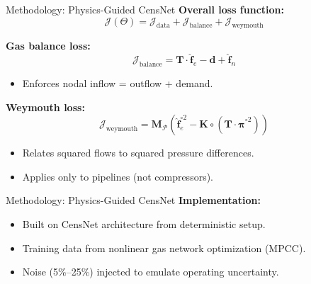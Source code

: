 \documentclass[hyperref={colorlinks,citecolor=blue,linkcolor=blue,urlcolor=blue}]{beamer}
\begin{document}
\begin{frame}{Methodology: Physics-Guided CensNet}
\small
\textbf{Overall loss function:}
\[
\mathcal{J}(\Theta) =
\mathcal{J}_{\text{data}} +
\mathcal{J}_{\text{balance}} +
\mathcal{J}_{\text{weymouth}}
\]

\textbf{Gas balance loss:}
\[
\mathcal{J}_{\text{balance}} =
\mathbf{T} \cdot \hat{\mathbf{f}}_e - \mathbf{d} + \hat{\mathbf{f}}_n
\]
\begin{itemize}
    \item Enforces nodal inflow = outflow + demand.
\end{itemize}

\textbf{Weymouth loss:}
\[
\mathcal{J}_{\text{weymouth}} =
\mathbf{M}_{\mathcal{P}}
\left( \hat{\mathbf{f}}_e^{\circ 2} -
\mathbf{K} \circ \left(\mathbf{T} \cdot \hat{\boldsymbol{\pi}}^{\circ 2} \right) \right)
\]
\begin{itemize}
    \item Relates squared flows to squared pressure differences.
    \item Applies only to pipelines (not compressors).
\end{itemize}
\end{frame}

\begin{frame}{Methodology: Physics-Guided CensNet}
\textbf{Implementation:}
\begin{itemize}
    \item Built on CensNet architecture from deterministic setup.
    \item Training data from nonlinear gas network optimization (MPCC).
    \item Noise (5\%–25\%) injected to emulate operating uncertainty.
\end{itemize}

\centering
    \resizebox{0.9\linewidth}{!}{}
\end{frame}



\end{document}
